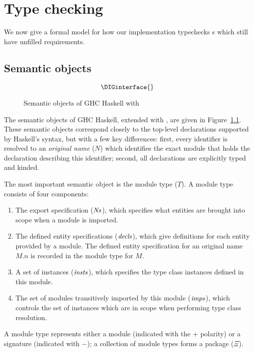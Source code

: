 \chapter{Type checking}
\label{sec:compiler}

We now give a formal model for how our implementation typechecks
\unit{}s which still have unfilled requirements.


\section{Semantic objects}

\begin{figure}
\[ \DIGinterface{} \]
\caption{Semantic objects of GHC Haskell with \Backpack{}}
\label{fig:semantic-objects}
\end{figure}

The semantic objects of GHC Haskell, extended with \Backpack{}, are
given in Figure~\ref{fig:semantic-objects}.  These semantic objects
correspond closely to the top-level declarations supported by
Haskell's syntax, but with a few key differences: first, every
identifier is resolved to an \emph{original name} ($N$) which identifies
the exact module that holds the declaration describing this identifier;
second, all declarations are explicitly typed and kinded.

The most important semantic object is the module type ($T$).  A module
type consists of four components:

\begin{enumerate}
    \item The export specification ($\mathit{Ns}$), which specifies what entities are brought
    into scope when a module is imported.
    \item The defined entity specifications ($\mathit{decls}$), which give definitions
    for each entity provided by a module.  The defined entity specification for
    an original name $M.n$ is recorded in the module type for $M$.
    \item A set of instances ($\mathit{insts}$), which specifies the type class
    instances defined in this module.
    \item The set of modules transitively imported by this module ($\mathit{imps}$),
    which controls the set of instances which are in scope when performing
    type class resolution.
\end{enumerate}
A module type represents either a module (indicated with the $+$ polarity)
or a signature (indicated with $-$); a collection of module types forms
a package ($\Xi$).




